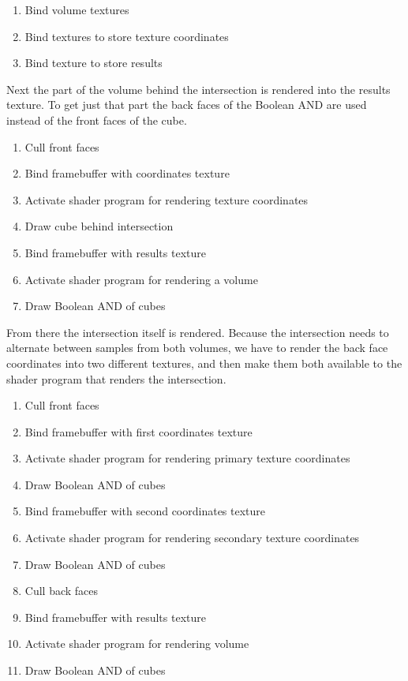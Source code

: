 \documentclass{article}
\begin{document}
\begin{enumerate}
  \item Bind volume textures
  \item Bind textures to store texture coordinates
  \item Bind texture to store results
\end{enumerate}

Next the part of the volume behind the intersection is rendered into the results
texture.  To get just that part the back faces of the Boolean AND are used
instead of the front faces of the cube.

\begin{enumerate}
  \item Cull front faces
  \item Bind framebuffer with coordinates texture
  \item Activate shader program for rendering texture coordinates
  \item Draw cube behind intersection
  \item Bind framebuffer with results texture
  \item Activate shader program for rendering a volume
  \item Draw Boolean AND of cubes
\end{enumerate}

From there the intersection itself is rendered.  Because the intersection needs
to alternate between samples from both volumes, we have to render the back face
coordinates into two different textures, and then make them both available to
the shader program that renders the intersection.

\begin{enumerate}
  \item Cull front faces
  \item Bind framebuffer with first coordinates texture
  \item Activate shader program for rendering primary texture coordinates
  \item Draw Boolean AND of cubes
  \item Bind framebuffer with second coordinates texture
  \item Activate shader program for rendering secondary texture coordinates
  \item Draw Boolean AND of cubes
  \item Cull back faces
  \item Bind framebuffer with results texture
  \item Activate shader program for rendering volume
  \item Draw Boolean AND of cubes
\end{enumerate}
\end{document}
